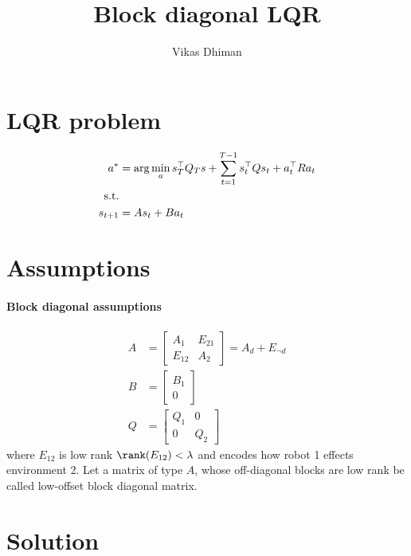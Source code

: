 \documentclass[]{article}
\title{Block diagonal LQR}
\author{Vikas Dhiman}
\begin{document}
\maketitle

\section{LQR problem}

\begin{equation}
  \begin{split}
  a^* &= \arg \min_{a} s_T^\top Q_Ts
  + \sum_{t=1}^{T-1} s_t^\top Q s_t
  + a_t^\top R a_t
  \\
  \text{s.t.}&
  \\
  s_{t+1} &= A s_t + B a_t
  \end{split}
\end{equation}

\section{Assumptions}

\paragraph{Block diagonal assumptions}

\begin{align}
  A &= \begin{bmatrix}
    A_1 & E_{21} \\
    E_{12}  & A_2
  \end{bmatrix}
              = A_d + E_{\neg d}
  \\
  B &= \begin{bmatrix}B_1\\ 0\end{bmatrix}
  \\
  Q &= \begin{bmatrix}
    Q_1 & 0 \\
    0  & Q_2
  \end{bmatrix}
\end{align}
where $E_{12}$ is low rank $\rank(E_{12}) < \lambda$ and encodes how robot 1
effects environment 2. Let a matrix of type $A$, whose off-diagonal blocks are
low rank be called low-offset block diagonal matrix.

\section{Solution}
\end{document}

